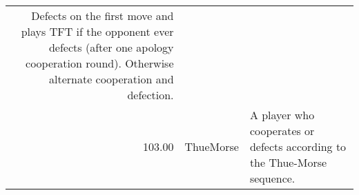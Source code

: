 \begin{tabular}{rll}
	Defects on the first move and plays TFT if the opponent ever defects (after
	one apology cooperation round). Otherwise alternate cooperation and defection.                                                                                                                                                                                                                                                                                                                                                                                                                                                                                                                                                                                                                                                                                                                                                                                         \\
	103.00 & ThueMorse                   & A player who cooperates or defects according to the Thue-Morse sequence.


\end{tabular}
